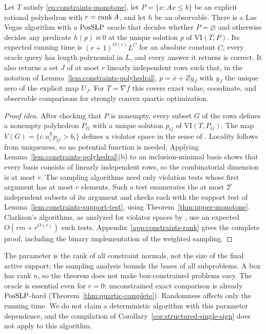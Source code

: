 \begin{theorem}
\label{thm:constraints-rank}
Let $T$ satisfy \eqref{eq:constraints-monotone}, let $P=\{x:Ax\le b\}$ be an
explicit rational polyhedron with $r=\operatorname{rank} A$, and let $h$ be an observable.
There is a Las Vegas algorithm with a $\mathrm{PosSLP}$ oracle that decides whether
$P=\varnothing$ and otherwise decides any predicate $h(p)\bowtie0$ at the
unique solution $p$ of $\mathrm{VI}(T,P)$. Its expected running time is
$(r+1)^{O(r)}L^{C}$ for an absolute constant $C$, every oracle query has
length polynomial in $L$, and every answer it returns is correct. It also
returns a set $J$ of at most $r$ linearly independent rows such that, in the
notation of Lemma~\ref{lem:constraints-polyhedral}, $p=\bar x+Zy_J$ with
$y_J$ the unique zero of the explicit map $U_J$. For $T=\nabla f$ this covers
exact value, coordinate, and observable comparisons for strongly convex
quartic optimization.
\end{theorem}

\begin{proof}[Proof idea]
After checking that $P$ is nonempty, every subset $G$ of the rows defines a
nonempty polyhedron $P_G$ with a unique solution $p_G$ of
$\mathrm{VI}(T,P_G)$. The map $V(G)=\{i:a_i^{\mathsf T}p_G>b_i\}$ defines a
violator space in the sense of \citet{GaertnerMatousekRuestSkovron2008}.
Locality follows from uniqueness, so no potential function is needed.
Applying Lemma~\ref{lem:constraints-polyhedral}(b) to an inclusion-minimal
basis shows that every basis consists of linearly independent rows, so the
combinatorial dimension is at most $r$. The sampling algorithms need only
violation tests whose first argument has at most $r$ elements. Such a test
enumerates the at most $2^r$ independent subsets of its argument and checks
each with the support test of Lemma~\ref{lem:constraints-support-test}, using
Theorem~\ref{thm:upper-monotone}. Clarkson's algorithms, as analyzed for
violator spaces by \citet{GaertnerMatousekRuestSkovron2008}, use an expected
$O(rm+r^{O(r)})$ such tests. Appendix~\ref{app:constraints-rank} gives the
complete proof, including the binary implementation of the weighted sampling.
\end{proof}

The parameter is the rank of all constraint normals, not the size of the
final active support; the sampling analysis bounds the bases of all
subproblems. A box has rank $n$, so the theorem does not make box-constrained
problems easy. The oracle is essential even for $r=0$: unconstrained exact
comparison is already $\mathrm{PosSLP}$-hard (Theorem~\ref{thm:quartic-complete}).
Randomness affects only the running time. We do not claim a deterministic
algorithm with this parameter dependence, and the compilation of
Corollary~\ref{cor:structured-single-sign} does not apply to this algorithm.

